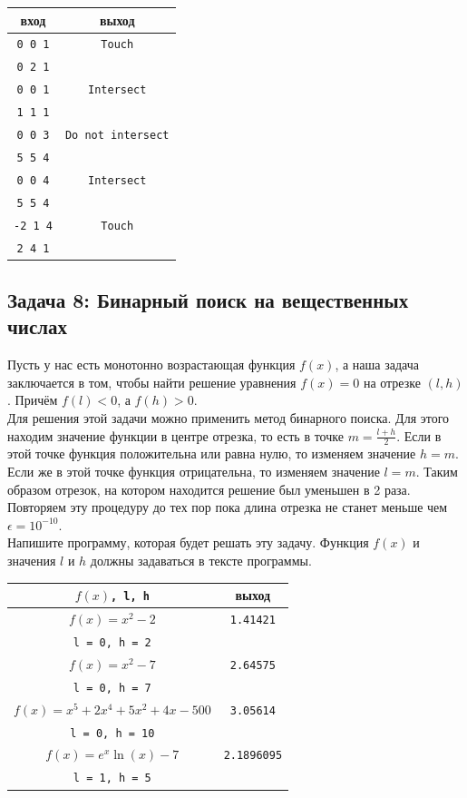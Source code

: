 \documentclass{article}
\begin{document}
\begin{center}
\begin{tabular}{ c c }
 вход & выход \\ \hline
 \texttt{0 0 1} & \texttt{Touch}  \\ 
 \texttt{0 2 1} &   \\  \hline
 \texttt{0 0 1} & \texttt{Intersect}  \\ 
 \texttt{1 1 1} &   \\  \hline
 \texttt{0 0 3} & \texttt{Do not intersect}  \\ 
 \texttt{5 5 4} &   \\  \hline
 \texttt{0 0 4} & \texttt{Intersect}  \\ 
 \texttt{5 5 4} &   \\  \hline
 \texttt{-2 1 4} & \texttt{Touch}  \\ 
 \texttt{2 4 1} &   \\
\end{tabular}
\end{center}


\subsection*{Задача 8: Бинарный поиск на вещественных числах} 
Пусть у нас есть монотонно возрастающая функция $f(x)$, а наша задача заключается в том, чтобы найти решение уравнения $f(x) = 0$ на отрезке $(l, h)$. Причём $f(l) < 0$, а $f(h) > 0$. \\

Для решения этой задачи можно применить метод бинарного поиска. Для этого находим значение функции в центре отрезка, то есть в точке $m = \frac{l + h}{2}$. Если в этой точке функция положительна или равна нулю, то изменяем значение $h = m$. Если же в этой точке функция отрицательна, то изменяем значение $l = m$. Таким образом отрезок, на котором находится решение был уменьшен в 2 раза. Повторяем эту процедуру до тех пор пока длина отрезка не станет меньше чем $\epsilon = 10^{-10}$.\\
Напишите программу, которая будет решать эту задачу. Функция $f(x)$ и значения $l$ и $h$ должны задаваться в тексте программы.

\renewcommand{\arraystretch}{1.3}
\begin{center}
\begin{tabular}{ c | c }
 $f(x)$\texttt{, l, h} & выход \\ \hline
 $f(x) = x^2 - 2$  & \texttt{1.41421}  \\ 
 \texttt{l = 0, h = 2} &   \\ \hline
 $f(x) = x^2 - 7$  & \texttt{2.64575}  \\ 
 \texttt{l = 0, h = 7} &   \\ \hline
 $f(x) = x^5 + 2x^4 + 5x^2 +4x - 500$  & \texttt{3.05614}  \\ 
 \texttt{l = 0, h = 10} &   \\\hline
 $f(x) = e^x \ln(x) - 7$  & \texttt{2.1896095}  \\ 
 \texttt{l = 1, h = 5} &   \\
\end{tabular}
\end{center}
\renewcommand{\arraystretch}{1}
\end{document}
